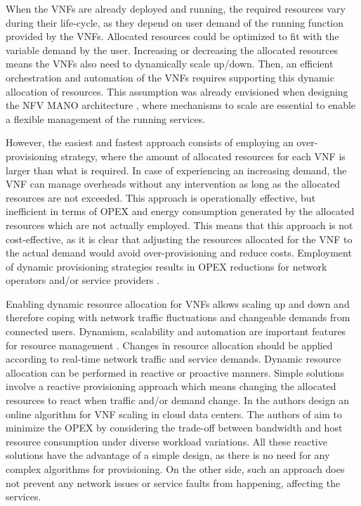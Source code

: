 When the VNFs are already deployed and running, the required resources vary during their life-cycle, as they depend on user demand of the running function provided by the VNFs. Allocated resources could be optimized to fit with the variable demand by the user. Increasing or decreasing the allocated resources means the VNFs also need to dynamically scale up/down. Then, an efficient orchestration and automation of the VNFs requires supporting this dynamic allocation of resources.
This assumption was already envisioned when designing the NFV MANO architecture \cite{Adamuz2018}, where mechanisms to scale are essential to enable a flexible management of the running services.

However, the easiest and fastest approach consists of employing an over-provisioning strategy, where the amount of allocated resources for each VNF is larger than what is required. In case of experiencing an increasing demand, the VNF can manage overheads without any intervention as long as the allocated resources are not exceeded. This approach is operationally effective, but inefficient in terms of OPEX and energy consumption generated by the allocated resources which are not actually employed. This means that this approach is not cost-effective, as it is clear that adjusting the resources allocated for the VNF to the actual demand would avoid over-provisioning and reduce costs.
Employment of dynamic provisioning strategies results in OPEX reductions for network operators and/or service providers \cite{Hernandez2015}.

Enabling dynamic resource allocation for VNFs allows scaling up and down and therefore coping with network traffic fluctuations and changeable demands from connected users. Dynamism, scalability and automation are important features for resource management \cite{Mijumbi2016}.
Changes in resource allocation should be applied according to real-time network traffic and service demands.
Dynamic resource allocation can be performed in reactive or proactive manners. Simple solutions involve a reactive provisioning approach which means changing the allocated resources to react when traffic and/or demand change.
In \cite{Wang2016} the authors design an online algorithm for VNF scaling in cloud data centers. The authors of \cite{Ghaznavi2015} aim to minimize the OPEX by considering the trade-off between bandwidth and host resource consumption under diverse workload variations.
All these reactive solutions have the advantage of a simple design, as there is no need for any complex algorithms for provisioning. On the other side, such an approach does not prevent any network issues or service faults from happening, affecting the services. %

